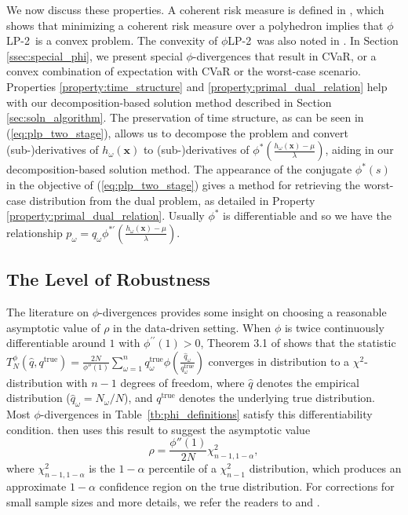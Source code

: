 \documentclass[ijoc,letterpaper]{informs3} %
\newcommand{\x}{\mathbf{x}}
\newcommand{\qtrue}{q^{\text{true}}}
\newcommand{\plp}{$\phi$LP-2}
\begin{document}
We now discuss these properties. A coherent risk measure is defined in \citep{rockafellar2007coherent}, which shows that minimizing a coherent risk measure over a polyhedron implies that \plp\ is a convex problem.
The convexity of \plp\ was also noted in \citep{bental2011robust}.
In Section \ref{ssec:special_phi}, we present special $\phi$-divergences that result in CVaR, or a convex combination of expectation with CVaR or the worst-case scenario. 
Properties \ref{property:time_structure} and \ref{property:primal_dual_relation} help with our decomposition-based solution method described in Section \ref{sec:soln_algorithm}. 
The preservation of time structure, as can be seen in (\ref{eq:plp_two_stage}), allows us to decompose the problem and convert (sub-)derivatives of $h_\omega(\x)$ to (sub-)derivatives of $\phi^*\left(\frac{h_\omega(\x) - \mu}{\lambda}\right)$, aiding in our decomposition-based solution method. 
The appearance of the conjugate $\phi^*(s)$ in the objective of (\ref{eq:plp_two_stage}) gives a method for retrieving the worst-case distribution from the dual problem, as detailed in Property \ref{property:primal_dual_relation}.  
Usually $\phi^*$ is differentiable and so we have the relationship $p_\omega = q_\omega \phi^{* \prime}(\frac{h_\omega(\x)-\mu}{\lambda})$. 



\subsection{The Level of Robustness}
\label{ssec:robust_level}

The literature on $\phi$-divergences provides some insight on choosing a reasonable asymptotic value of $\rho$ in the data-driven setting. 
When $\phi$ is twice continuously differentiable around $1$ with $\phi^{\prime \prime}(1)>0$, Theorem 3.1 of \cite{pardo2005statistical} shows that the statistic $T^\phi_N(\hat{q},\qtrue) = \frac{2N}{\phi''(1)} \sum_{\omega=1}^n \qtrue_\omega \phi\left(\frac{\hat{q}_\omega}{\qtrue_\omega}\right)$ converges in distribution to a $\chi^2$-distribution with $n-1$ degrees of freedom, where $\hat{q}$ denotes the empirical distribution ($\hat{q}_\omega = N_\omega/N$), and $\qtrue$ denotes the underlying true distribution.
Most $\phi$-divergences in Table~\ref{tb:phi_definitions} satisfy this differentiability condition.
\cite{bental2011robust} then uses this result to suggest the asymptotic value
\begin{equation} \label{eq:asymptotic_rho}
	\rho = \frac{\phi''(1)}{2N} \chi^2_{n-1,1-\alpha},
\end{equation}
where $\chi^2_{n-1,1-\alpha}$ is the $1-\alpha$ percentile of a $\chi^2_{n-1}$ distribution, which produces an approximate $1-\alpha$ confidence region on the true distribution.
For corrections for small sample sizes and more details, we refer the readers to \citep{pardo2005statistical} and \citep{bental2011robust}. 
\end{document}
